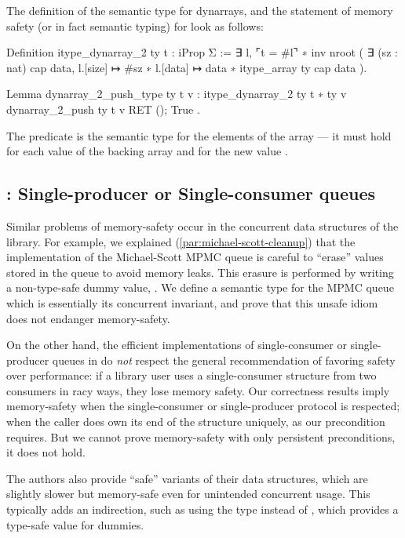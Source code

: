 The definition of the semantic type for dynarrays, and the statement of memory safety (or in fact semantic typing) for  look as follows:
\begin{coqcode}
Definition itype_dynarray_2 ty t : iProp Σ :=
  ∃ l,
  ⌜t = #l⌝ ∗
  inv nroot (
    ∃ (sz : nat) cap data,
    l.[size] ↦ #sz ∗
    l.[data] ↦ data ∗ itype_array ty cap data
  ).

Lemma dynarray_2_push_type ty t v :
  {{{ itype_dynarray_2 ty t ∗ ty v }}}
    dynarray_2_push ty t v
  {{{ RET (); True }}}.
\end{coqcode}

The predicate  is the semantic type for the elements of the array --- it must hold for each value of the backing array and for the new value .

\subsection{\Saturn: Single-producer or Single-consumer queues}

Similar problems of memory-safety occur in the concurrent data structures of the \Saturn library. For example, we explained (\cref{par:michael-scott-cleanup}) that the \Saturn implementation of the Michael-Scott MPMC queue is careful to ``erase'' values stored in the queue to avoid memory leaks. This erasure is performed by writing a non-type-safe dummy value, . We define a semantic type for the MPMC queue which is essentially its concurrent invariant, and prove that this unsafe idiom does not endanger memory-safety.

On the other hand, the efficient implementations of single-consumer or single-producer queues in \Saturn do \emph{not} respect the general \OCaml recommendation of favoring safety over performance: if a library user uses a single-consumer structure from two consumers in racy ways, they lose memory safety. Our correctness results imply memory-safety when the single-consumer or single-producer protocol is respected; when the caller does own its end of the structure uniquely, as our precondition requires. But we cannot prove memory-safety with only persistent preconditions, it does not hold.

The \Saturn authors also provide ``safe'' variants of their data structures, which are slightly slower but memory-safe even for unintended concurrent usage. This typically adds an indirection, such as using the type  instead of , which provides a type-safe  value for dummies.

